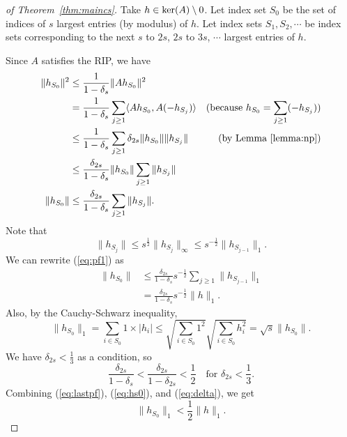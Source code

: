 \begin{proof}[of Theorem~\ref{thm:maincs}]
Take $h \in \ker(A) \setminus \boldmath{0}$. Let index set $S_0$ be the set of indices of $s$
largest entries (by modulus) of $h$. Let index sets $S_1, S_2, \cdots$ be index sets
corresponding to the next $s$ to $2s$, $2s$ to $3s$, $\cdots$ largest entries of $h$.

Since $A$ satisfies the RIP, we have
\begin{align}
\|h_{S_0}\|^2 & \leq \frac{1}{1-\delta_s} \|Ah_{S_0}\|^2 \\
& = \frac{1}{1-\delta_s} \sum_{j \geq 1} \langle Ah_{S_0}, A(-h_{S_j}) \rangle 
& \text{(because $h_{S_0} = \sum_{j \geq 1} (-h_{S_j})$)} \\
& \le  \frac{1}{1-\delta_s} \sum_{j \geq 1} \delta_{2s} \|h_{S_0}\| \|h_{S_j}\|
& \text{(by Lemma~\ref{lemma:np})} \\
& \leq \frac{\delta_{2s}}{1 - \delta_s} \|h_{S_0}\| \sum_{j \geq 1} \|h_{S_j}\| \\
\|h_{S_0}\| & \leq \frac{\delta_{2s}}{1 - \delta_s} \sum_{j \geq 1} \|h_{S_j}\| .
\label{eq:pf1}
\end{align}
Note that
\[
\|h_{S_j}\| \leq s^{\frac{1}{2}} \|h_{S_j}\|_\infty \leq s^{-\frac{1}{2}} \|h_{S_{j-1}}\|_1.
\]
We can rewrite (\ref{eq:pf1}) as 
\begin{align}
\|h_{S_0}\| & \leq \frac{\delta_{2s}}{1 - \delta_s} s^{-\frac{1}{2}} \sum_{j \geq 1} \|h_{S_{j-1}}\|_1 \\
& = \frac{\delta_{2s}}{1 - \delta_s} s^{-\frac{1}{2}} \|h\|_1.
\label{eq:lastpf}
\end{align}
Also, by the Cauchy-Schwarz inequality,
\begin{equation}
\|h_{S_0}\|_1 = \sum_{i \in S_0} 1 \times |h_i| \leq \sqrt{\sum_{i \in S_0} 1^2}\sqrt{\sum_{i \in S_0} h_i^2} 
= \sqrt{s} \|h_{S_0}\|.
\label{eq:hs0}
\end{equation}
We have $\delta_{2s} < \frac{1}{3}$ as a condition, so
\begin{equation}
\frac{\delta_{2s}}{1-\delta_s} < \frac{\delta_{2s}}{1-\delta_{2s}} < \frac{1}{2} \quad \text{for $\delta_{2s} < \frac{1}{3}$}.
\label{eq:delta}
\end{equation}
Combining (\ref{eq:lastpf}), (\ref{eq:hs0}), and  (\ref{eq:delta}), we get
\begin{equation}
\|h_{S_0}\|_1 < \frac{1}{2} \|h\|_1.
\label{eq:pfhs0h1}
\end{equation}


\end{proof}
